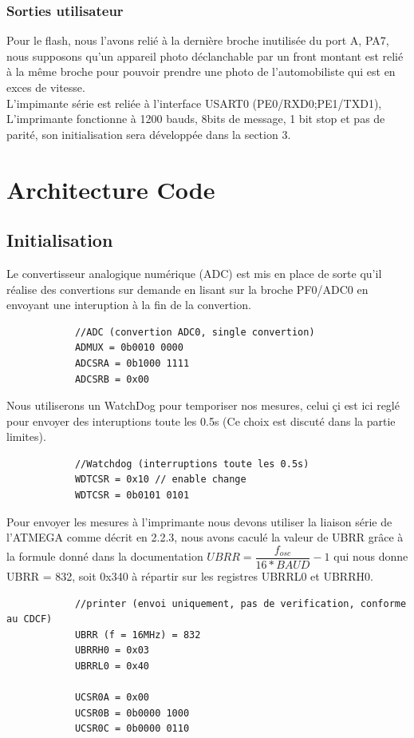 \documentclass[a4paper, 12pt]{article}
\begin{document}
		\subsubsection{Sorties utilisateur}
		Pour le flash, nous l'avons relié à la dernière broche inutilisée du port A, PA7, nous supposons qu'un appareil photo déclanchable par un front montant est relié à la même broche pour pouvoir prendre une photo de l'automobiliste qui est en exces de vitesse.\\
		L'impimante série est reliée à l'interface USART0 (PE0/RXD0;PE1/TXD1), L'imprimante fonctionne à 1200 bauds, 8bits de message, 1 bit stop et pas de parité, son initialisation sera développée dans la section 3.\\
	\newpage
	\section{Architecture Code}
		\subsection{Initialisation}
		Le convertisseur analogique numérique (ADC) est mis en place de sorte qu'il réalise des convertions sur demande en lisant sur la broche PF0/ADC0 en envoyant une interuption à la fin de la convertion.
		\begin{lstlisting}
			//ADC (convertion ADC0, single convertion)
			ADMUX = 0b0010 0000
			ADCSRA = 0b1000 1111
			ADCSRB = 0x00
		\end{lstlisting}
		
		Nous utiliserons un WatchDog pour temporiser nos mesures, celui çi est ici reglé pour envoyer des interuptions toute les 0.5s (Ce choix est discuté dans la partie limites).
		\begin{lstlisting}
			//Watchdog (interruptions toute les 0.5s)
			WDTCSR = 0x10 // enable change
			WDTCSR = 0b0101 0101
		\end{lstlisting}

		Pour envoyer les mesures à l'imprimante nous devons utiliser la liaison série de l'ATMEGA comme décrit en 2.2.3, nous avons caculé la valeur de UBRR grâce à la formule donné dans la documentation $UBRR = \dfrac{f_{osc}}{16*BAUD} - 1$ qui nous donne UBRR = 832, soit 0x340 à répartir sur les registres UBRRL0 et UBRRH0.
		\begin{lstlisting}
			//printer (envoi uniquement, pas de verification, conforme au CDCF)
			UBRR (f = 16MHz) = 832
			UBRRH0 = 0x03
			UBRRL0 = 0x40
			
			UCSR0A = 0x00
			UCSR0B = 0b0000 1000
			UCSR0C = 0b0000 0110			
		\end{lstlisting}	
	
\end{document}
